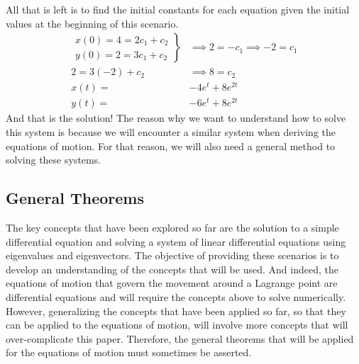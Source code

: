 \documentclass[12pt]{article}
\begin{document}
	All that is left is to find the initial constants for each equation given the initial values at the beginning of this scenario.
	\begin{align*}
		\left. \begin{array}{l}
			x(0) = 4 = 2c_1 + c_2 \\
			y(0) = 2 = 3c_1 + c_2
		\end{array} \right\}
		&\implies 2 = -c_1 \implies -2 = c_1 \\
		2 = 3(-2) + c_2 &\implies 8 = c_2 \\
		x(t) =& -4e^t + 8e^{2t} \\
		y(t) =& -6e^t + 8e^{2t} 
	\end{align*}
	And that is the solution!
	The reason why we want to understand how to solve this system is because we will encounter a similar system when deriving the equations of motion.
	For that reason, we will also need a general method to solving these systems.
	
	\subsection{General Theorems}
	
	The key concepts that have been explored so far are the solution to a simple differential equation and solving a system of linear differential equations using eigenvalues and eigenvectors.
	The objective of providing these scenarios is to develop an understanding of the concepts that will be used.
	And indeed, the equations of motion that govern the movement around a Lagrange point are differential equations and will require the concepts above to solve numerically.
	However, generalizing the concepts that have been applied so far, so that they can be applied to the equations of motion, will involve more concepts that will over-complicate this paper.
	Therefore, the general theorems that will be applied for the equations of motion must sometimes be asserted.
	
\end{document}
